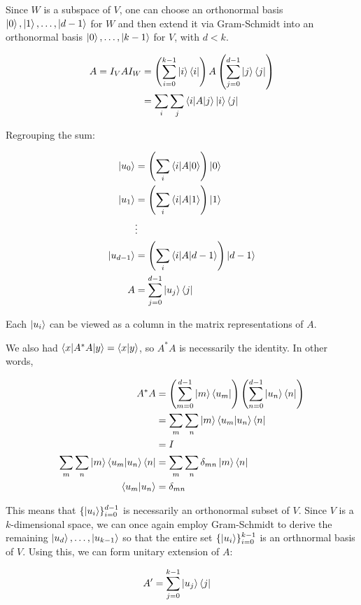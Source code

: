 \documentclass[all.tex]{subfiles}
\begin{document}
\ignorespaces
\parindent 0pt

\par Since $W$ is a subspace of $V$, one can choose an orthonormal basis
$\ket{0}, \ket{1}, \ldots, \ket{d-1}$ for $W$ and then extend it via
Gram-Schmidt into an orthonormal basis $\ket{0}, \ldots, \ket{k-1}$ for $V$,
with $d < k$.

\begin{align}
A = I_V A I_W &= \left( \sum_{i = 0}^{k - 1}{\ket{i} \bra{i}} \right) A \left(
\sum_{j = 0}^{d - 1}{\ket{j} \bra{j}} \right) \\
&= \sum_i{\sum_j{\braket{i|A|j} \ket{i} \bra{j}}}
\end{align}

Regrouping the sum:

\begin{align*}
\ket{u_0} &= \left( \sum_i{\braket{i|A|0}} \right) \ket{0} \\
\ket{u_1} &= \left( \sum_i{\braket{i|A|1}} \right) \ket{1} \\
&\vdots \\
\ket{u_{d-1}} &= \left( \sum_i{\braket{i|A|d-1}} \right) \ket{d-1} \\
A &= \sum_{j = 0}^{d - 1}{\ket{u_j} \bra{j}}
\end{align*}

Each $\ket{u_i}$ can be viewed as a column in the matrix representations of $A$.

\par We also had $\braket{x|A^* A|y} = \braket{x|y}$, so $A^* A$ is necessarily
the identity. In other words,

\begin{align}
A^* A &= \left( \sum_{m = 0}^{d - 1}{\ket{m} \bra{u_m}} \right) \left(
\sum_{n = 0}^{d - 1}{\ket{u_n} \bra{n}} \right) \\
&= \sum_m{\sum_n{\ket{m} \braket{u_m|u_n} \bra{n}}} \\
&= I \\
\sum_m{\sum_n{\ket{m} \braket{u_m|u_n} \bra{n}}} &= \sum_m{\sum_n{\delta_{mn}
\ket{m} \bra{n}}} \\
\braket{u_m|u_n} &= \delta_{mn}
\end{align}

This means that $\{\ket{u_i}\}_{i = 0}^{d - 1}$ is necessarily an orthonormal
subset of $V$. Since $V$ is a $k$-dimensional space, we can once again employ
Gram-Schmidt to derive the remaining $\ket{u_d}, \ldots, \ket{u_{k-1}}$ so that
the entire set $\{\ket{u_i}\}_{i = 0}^{k - 1}$ is an orthnormal basis of $V$.
Using this, we can form unitary extension of $A$:

\begin{align}
A' &= \sum_{j = 0}^{k - 1}{\ket{u_j} \bra{j}}
\end{align}
\end{document}
